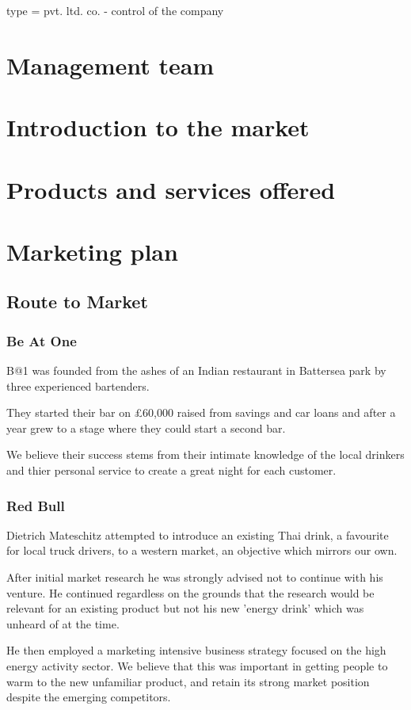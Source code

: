 \documentclass{article}
\begin{document}
type = pvt. ltd. co. - control of the company

\section{Management team}

\section{Introduction to the market}
\section{Products and services offered}
\section{Marketing plan}

\subsection{Route to Market}
\subsubsection{Be At One}
B@1 was founded from the ashes of an Indian restaurant in Battersea park by
three experienced bartenders.

They started their bar on £60,000 raised from savings and car loans and after a
year grew to a stage where they could start a second bar.

We believe their success stems from their intimate knowledge of the local drinkers and thier personal service to create a great night for each customer.

\subsubsection{Red Bull}
Dietrich Mateschitz attempted to introduce an existing Thai drink, a favourite
for local truck drivers, to a western market, an objective which
mirrors our own.

After initial market research he was strongly advised not to continue with his
venture. He continued regardless on the grounds that the research would be
relevant for an existing product but not his new 'energy drink' which was
unheard of at the time.

He then employed a marketing intensive business strategy focused on the high energy activity sector. We believe that this was important in getting people to warm to the new unfamiliar product, and retain its strong market position despite the emerging competitors. 
\end{document}
